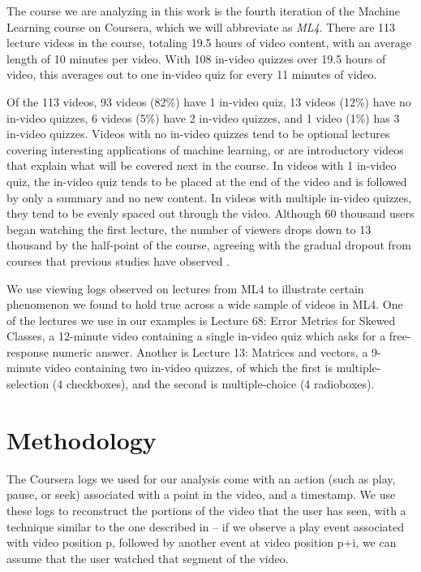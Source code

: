 \documentclass{sigchi}
\begin{document}
The course we are analyzing in this work is the fourth iteration of the Machine Learning course on Coursera, which we will abbreviate as \textit{ML4}. There are 113 lecture videos in the course, totaling 19.5 hours of video content, with an average length of 10 minutes per video.  With 108 in-video quizzes over 19.5 hours of video, this averages out to one in-video quiz for every 11 minutes of video.

Of the 113 videos, 93 videos (82\%) have 1 in-video quiz, 13 videos (12\%) have no in-video quizzes, 6 videos (5\%) have 2 in-video quizzes, and 1 video (1\%) has 3 in-video quizzes. Videos with no in-video quizzes tend to be optional lectures covering interesting applications of machine learning, or are introductory videos that explain what will be covered next in the course. In videos with 1 in-video quiz, the in-video quiz tends to be placed at the end of the video and is followed by only a summary and no new content. In videos with multiple in-video quizzes, they tend to be evenly spaced out through the video. Although 60 thousand users began watching the first lecture, the number of viewers drops down to 13 thousand by the half-point of the course, agreeing with the gradual dropout from courses that previous studies have observed \cite{dropout}.

We use viewing logs observed on lectures from ML4 to illustrate certain phenomenon we found to hold true across a wide sample of videos in ML4. One of the lectures we use in our examples is Lecture 68: Error Metrics for Skewed Classes, a 12-minute video containing a single in-video quiz which asks for a free-response numeric answer. Another is Lecture 13: Matrices and vectors, a 9-minute video containing two in-video quizzes, of which the first is multiple-selection (4 checkboxes), and the second is multiple-choice (4 radioboxes).

\section{Methodology}

The Coursera logs we used for our analysis come with an action (such as play, pause, or seek) associated with a point in the video, and a timestamp. We use these logs to reconstruct the portions of the video that the user has seen, with a technique similar to the one described in \cite{juho} -- if we observe a play event associated with video position p, followed by another event at video position p+i, we can assume that the user watched that segment of the video.
\end{document}
